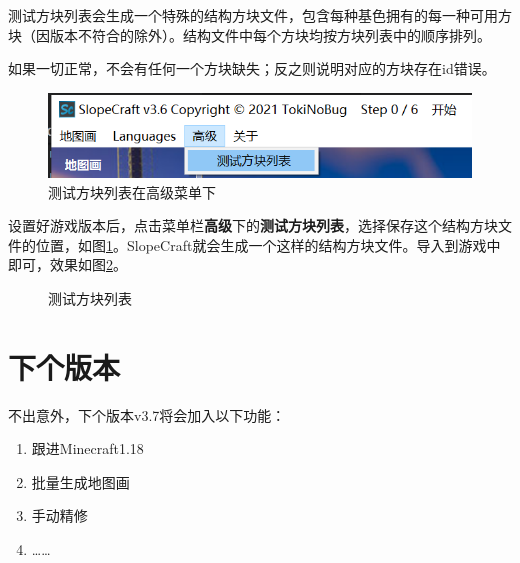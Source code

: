 \documentclass{article}
\begin{document}
    测试方块列表会生成一个特殊的结构方块文件，包含每种基色拥有的每一种可用方块（因版本不符合的除外）。结构文件中每个方块均按方块列表中的顺序排列。
    
    如果一切正常，不会有任何一个方块缺失；反之则说明对应的方块存在id错误。
    
    \begin{figure}[htbp]
        \centering
        \includegraphics[width=15cm]{Img9_TestBlockList.png}
        \caption{测试方块列表在高级菜单下}
        \label{locOfTestBlockList}
    \end{figure}

    设置好游戏版本后，点击菜单栏\textbf{高级}下的\textbf{测试方块列表}，选择保存这个结构方块文件的位置，如图\ref*{locOfTestBlockList}。SlopeCraft就会生成一个这样的结构方块文件。导入到游戏中即可，效果如图\ref*{testBlockListNBT}。

    \begin{figure}[htbp]
        \centering
        \caption{测试方块列表}
        \label{testBlockListNBT}
    \end{figure}

\section{下个版本}
    不出意外，下个版本v3.7将会加入以下功能：
    \begin{enumerate}
        \item 跟进Minecraft1.18
        \item 批量生成地图画
        \item 手动精修
        \item ……
    \end{enumerate}
\end{document}

